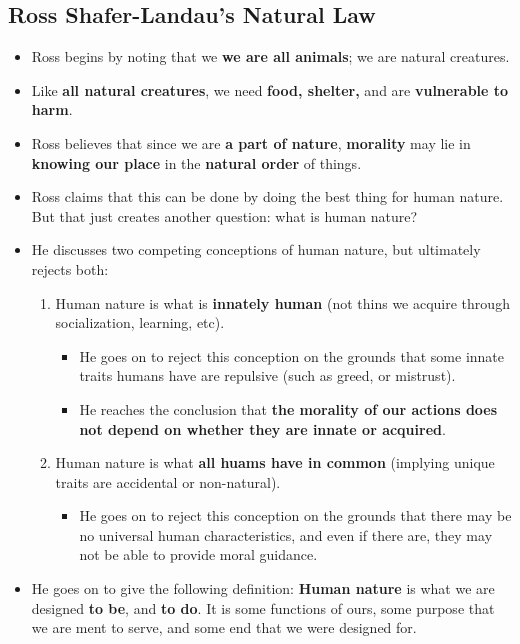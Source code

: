 \documentclass{article}
\begin{document}
    \subsection*{Ross Shafer-Landau's Natural Law}
    \begin{itemize}
        \item Ross begins by noting that we \textbf{we are all animals}; we are natural creatures.
        \item Like \textbf{all natural creatures}, we need \textbf{food, shelter,} and are \textbf{vulnerable to harm}.
        \item Ross believes that since we are \textbf{a part of nature}, \textbf{morality} may lie in \textbf{knowing our place} in the \textbf{natural order} of things.
        \item Ross  claims that this can be done by doing the best thing for human nature. But that just creates another question: what is human nature?
        \item He discusses two competing conceptions of human nature, but ultimately rejects both:
        \begin{enumerate}
            \item Human nature is what is \textbf{innately human} (not thins we acquire through socialization, learning, etc).
            \begin{itemize}
                \item He goes on to reject this conception on the grounds that some innate traits humans have are repulsive (such as greed, or mistrust).
                \item He reaches the conclusion that \textbf{the morality of our actions does not depend on whether they are innate or acquired}.
            \end{itemize}
            \item Human nature is what \textbf{all huams have in common} (implying unique traits are accidental or non-natural).
            \begin{itemize}
                \item He goes on to reject this conception on the grounds that there may be no universal human characteristics, and even if there are, they may not be able to provide moral guidance.
            \end{itemize}
        \end{enumerate}
        \item He goes on to give the following definition: \textbf{Human nature} is what we are designed \textbf{to be}, and \textbf{to do}. It is some functions of ours, some purpose that we are ment to serve, and some end that we were designed for.

\end{itemize}
\end{document}
